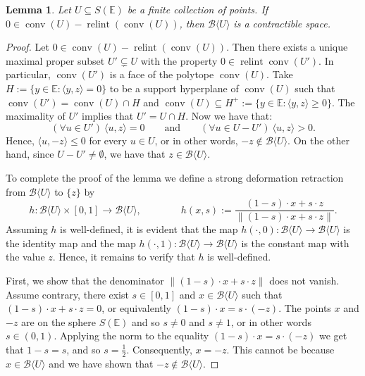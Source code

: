 \documentclass[a4paper,11pt,reqno, english]{amsart}
\newtheorem{lemma}[theorem]{Lemma}
\theoremstyle{definition}
\theoremstyle{remark}
\newcommand\E{\mathbb{E}}
\DeclareMathOperator{\relint}{\mathrm{relint}}
\DeclareMathOperator{\conv}{\mathrm{conv}}
\begin{document}
\medskip
\begin{lemma}
	\label{lem :  case 02}
	Let $U\subseteq S(\E)$ be a finite collection of points.
	If $0\in \conv (U) - \relint(\conv (U))$, then $\mathscr{B}\langle U\rangle$ is a contractible space.
\end{lemma}
\begin{proof}
	Let $0\in \conv (U) - \relint(\conv (U))$.
	Then there exists a unique maximal proper subset $U'\subsetneq  U$ with the property $0\in \relint\conv (U')$.
	In particular, $\conv (U')$ is a face of the polytope $\conv (U)$.
	Take $H:=\{y\in \E : \langle y,z\rangle=0\}$ to be a support hyperplane of $\conv (U)$ such that $\conv (U')=\conv (U)\cap H$ and $\conv (U)\subseteq H^+:=\{y\in \E : \langle y,z\rangle\geq 0\}$.
	The maximality of $U'$ implies that $U'=U\cap H$.
	Now we have that:
	\[
		(\forall u\in U')\ \langle u,z\rangle =0
		\qquad\text{and}\qquad
		(\forall u\in U-U')\ \langle u,z\rangle >0.
	\]
	Hence, $\langle u,-z\rangle \leq 0$ for every $u\in U$, or in other words, $-z\notin \mathscr{B}\langle U\rangle$.
	On the other hand, since $U-U'\neq\emptyset$, we have that $z\in \mathscr{B}\langle U\rangle$.

	\medskip
	To complete the proof of the lemma we define a strong deformation retraction from $\mathscr{B}\langle U\rangle$ to $\{z\}$ by
	\[
		h\colon \mathscr{B}\langle U\rangle\times [0,1]\longrightarrow \mathscr{B}\langle U\rangle,
		\qquad\qquad
		h(x,s):=\frac{(1-s)\cdot x+s\cdot z}{\| (1-s)\cdot x+s\cdot z\|}.
	\]
	Assuming $h$ is well-defined, it is evident that the map $h(\cdot,0)\colon \mathscr{B}\langle U\rangle\longrightarrow \mathscr{B}\langle U\rangle$ is the identity map and the map $h(\cdot,1)\colon \mathscr{B}\langle U\rangle\longrightarrow \mathscr{B}\langle U\rangle$ is the constant map with the value $z$.
	Hence, it remains to verify that $h$ is well-defined.

	\medskip
	First, we show that the denominator $\|(1-s)\cdot x+s\cdot z\|$ does not vanish.
	Assume contrary, there exist $s\in [0,1]$ and $x\in  \mathscr{B}\langle U\rangle$ such that $(1-s)\cdot x+s\cdot z=0$, or equivalently $(1-s)\cdot x= s\cdot (-z)$.
	The points $x$ and $-z$ are on the sphere $S(\E)$ and so $s\neq 0$ and $s\neq 1$, or in other words $s\in (0,1)$.
	Applying the norm to the equality $(1-s)\cdot x= s\cdot (-z)$ we get that $1-s=s$, and so $s=\frac12$.
	Consequently, $x=-z$.
	This cannot be because $x\in \mathscr{B}\langle U\rangle$ and we have shown that $-z\notin \mathscr{B}\langle U\rangle$.


\end{proof}
\end{document}
